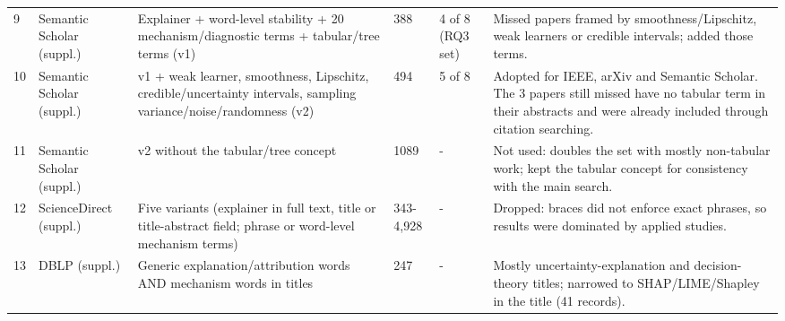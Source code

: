 \begin{longtable}{@{}P{0.4cm}P{1.9cm}P{6.2cm}P{1.3cm}P{1.2cm}P{4.6cm}@{}}
9 & Semantic Scholar (suppl.) & Explainer + word-level stability + 20 mechanism/\allowbreak{}diagnostic terms + tabular/\allowbreak{}tree terms (v1) & 388 & 4 of 8 (RQ3 set) & Missed papers framed by smoothness/\allowbreak{}Lipschitz, weak learners or credible intervals; added those terms. \\
10 & Semantic Scholar (suppl.) & v1 + weak learner, smoothness, Lipschitz, credible/\allowbreak{}uncertainty intervals, sampling variance/\allowbreak{}noise/\allowbreak{}randomness (v2) & 494 & 5 of 8 & Adopted for IEEE, arXiv and Semantic Scholar. The 3 papers still missed have no tabular term in their abstracts and were already included through citation searching. \\
11 & Semantic Scholar (suppl.) & v2 without the tabular/\allowbreak{}tree concept & 1089 & - & Not used: doubles the set with mostly non-tabular work; kept the tabular concept for consistency with the main search. \\
12 & ScienceDirect (suppl.) & Five variants (explainer in full text, title or title-abstract field; phrase or word-level mechanism terms) & 343-4,928 & - & Dropped: braces did not enforce exact phrases, so results were dominated by applied studies. \\
13 & DBLP (suppl.) & Generic explanation/\allowbreak{}attribution words AND mechanism words in titles & 247 & - & Mostly uncertainty-explanation and decision-theory titles; narrowed to SHAP/\allowbreak{}LIME/\allowbreak{}Shapley in the title (41 records). \\
\end{longtable}
